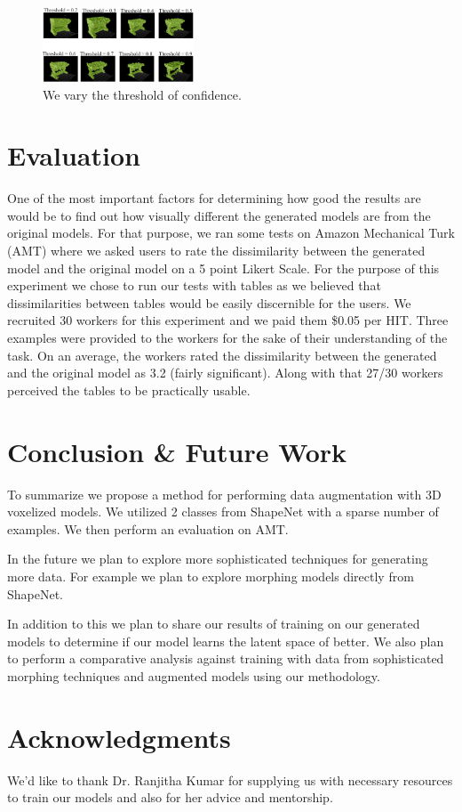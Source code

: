 \documentclass{sigchi}
\begin{document}
\begin{figure}
\includegraphics[width=0.4\textwidth]{figs/table_random.png}
\centering
\caption{We vary the threshold of confidence.}
\label{fig:table_random}
\end{figure}

\section{Evaluation}

One of the most important factors for determining how good the results are would be to find out how visually different the generated models are from the original models. For that purpose, we ran some tests on Amazon Mechanical Turk (AMT) where we asked users to rate the dissimilarity between the generated model and the original model on a 5 point Likert Scale. For the purpose of this experiment we chose to run our tests with tables as we believed that dissimilarities between tables would be easily discernible for the users. 
We recruited 30 workers for this experiment and we paid them \$0.05 per HIT. Three examples were provided to the workers for the sake of their understanding of the task. 
On an average, the workers rated the dissimilarity between the generated and the original model as 3.2 (fairly significant). Along with that 27/30 workers perceived the tables to be practically usable. 



\section{Conclusion \& Future Work}
To summarize we propose a method for performing data augmentation with 3D voxelized models. We utilized 2 classes from ShapeNet with a sparse number of examples. We then perform an evaluation on AMT.

In the future we plan to explore more sophisticated techniques for generating more data. For example we plan to explore morphing models directly from ShapeNet. 

In addition to this we plan to share our results of training on our generated models to determine if our model learns the latent space of better. We also plan to perform a comparative analysis against training with data from sophisticated morphing techniques and augmented models using our methodology.


\section{Acknowledgments}
We'd like to thank Dr. Ranjitha Kumar for supplying us with necessary resources to train our models and also for her advice and mentorship.
\balance




\end{document}
